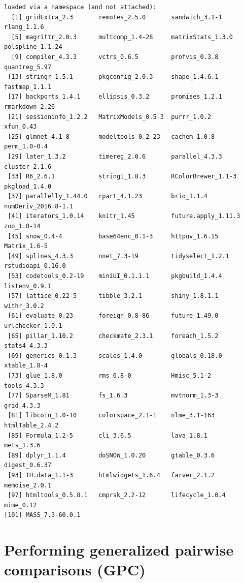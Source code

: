 \documentclass[12pt]{article}
\begin{document}
\begin{verbatim}
loaded via a namespace (and not attached):
  [1] gridExtra_2.3       remotes_2.5.0       sandwich_3.1-1      rlang_1.1.6        
  [5] magrittr_2.0.3      multcomp_1.4-28     matrixStats_1.3.0   polspline_1.1.24   
  [9] compiler_4.3.3      vctrs_0.6.5         profvis_0.3.8       quantreg_5.97      
 [13] stringr_1.5.1       pkgconfig_2.0.3     shape_1.4.6.1       fastmap_1.1.1      
 [17] backports_1.4.1     ellipsis_0.3.2      promises_1.2.1      rmarkdown_2.26     
 [21] sessioninfo_1.2.2   MatrixModels_0.5-3  purrr_1.0.2         xfun_0.43          
 [25] glmnet_4.1-8        modeltools_0.2-23   cachem_1.0.8        perm_1.0-0.4       
 [29] later_1.3.2         timereg_2.0.6       parallel_4.3.3      cluster_2.1.6      
 [33] R6_2.6.1            stringi_1.8.3       RColorBrewer_1.1-3  pkgload_1.4.0      
 [37] parallelly_1.44.0   rpart_4.1.23        brio_1.1.4          numDeriv_2016.8-1.1
 [41] iterators_1.0.14    knitr_1.45          future.apply_1.11.3 zoo_1.8-14         
 [45] snow_0.4-4          base64enc_0.1-3     httpuv_1.6.15       Matrix_1.6-5       
 [49] splines_4.3.3       nnet_7.3-19         tidyselect_1.2.1    rstudioapi_0.16.0  
 [53] codetools_0.2-19    miniUI_0.1.1.1      pkgbuild_1.4.4      listenv_0.9.1      
 [57] lattice_0.22-5      tibble_3.2.1        shiny_1.8.1.1       withr_3.0.2        
 [61] evaluate_0.23       foreign_0.8-86      future_1.49.0       urlchecker_1.0.1   
 [65] pillar_1.10.2       checkmate_2.3.1     foreach_1.5.2       stats4_4.3.3       
 [69] generics_0.1.3      scales_1.4.0        globals_0.18.0      xtable_1.8-4       
 [73] glue_1.8.0          rms_6.8-0           Hmisc_5.1-2         tools_4.3.3        
 [77] SparseM_1.81        fs_1.6.3            mvtnorm_1.3-3       grid_4.3.3         
 [81] libcoin_1.0-10      colorspace_2.1-1    nlme_3.1-163        htmlTable_2.4.2    
 [85] Formula_1.2-5       cli_3.6.5           lava_1.8.1          mets_1.3.6         
 [89] dplyr_1.1.4         doSNOW_1.0.20       gtable_0.3.6        digest_0.6.37      
 [93] TH.data_1.1-3       htmlwidgets_1.6.4   farver_2.1.2        memoise_2.0.1      
 [97] htmltools_0.5.8.1   cmprsk_2.2-12       lifecycle_1.0.4     mime_0.12          
[101] MASS_7.3-60.0.1
\end{verbatim}

\clearpage

\section{Performing generalized pairwise comparisons (GPC)}
\label{sec:org20bcfb1}
\end{document}
